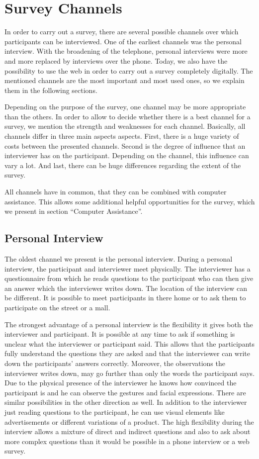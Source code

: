 \documentclass{report}
\begin{document}
\chapter{Survey Channels}
In order to carry out a survey, there are several possible channels over which participants can be interviewed. One of the earliest channels was the personal interview. With the broadening of the telephone, personal interviews were more and more replaced by interviews over the phone. Today, we also have the possibility to use the web in order to carry out a survey completely digitally. The mentioned channels are the most important and most used ones, so we explain them in the following sections.

Depending on the purpose of the survey, one channel may be more appropriate than the others. In order to allow to decide whether there is a best channel for a survey, we mention the strength and weaknesses for each channel. Basically, all channels differ in three main aspects aspects. First, there is a huge variety of costs between the presented channels. Second is the degree of influence that an interviewer has on the participant. Depending on the channel, this influence can vary a lot. And last, there can be huge differences regarding the extent of the survey.

All channels have in common, that they can be combined with computer assistance. This allows some additional helpful opportunities for the survey, which we present in section “Computer Assistance”.


\section{Personal Interview}

The oldest channel we present is the personal interview. During a personal interview, the participant and interviewer meet physically. The interviewer has a questionnaire from which he reads questions to the participant who can then give an answer which the interviewer writes down. The location of the interview can be different. It is possible to meet participants in there home or to ask them to participate on the street or a mall.

The strongest advantage of a personal interview is the flexibility it gives both the interviewer and participant. It is possible at any time to ask if something is unclear what the interviewer or participant said. This allows that the participants fully understand the questions they are asked and that the interviewer can write down the participants’ answers correctly. Moreover, the observations the interviewer writes down, may go further than only the words the participant says. Due to the physical presence of the interviewer he knows how convinced the participant is and he can observe the gestures and facial expressions. There are similar possibilities in the other direction as well. In addition to the interviewer just reading questions to the participant, he can use visual elements like advertisements or different variations of a product. The high flexibility during the interview allows a mixture of direct and indirect questions and also to ask about more complex questions than it would be possible in a phone interview or a web survey.
\end{document}
